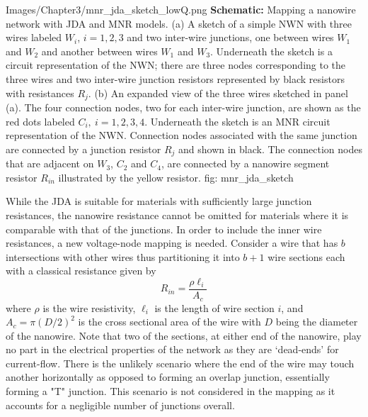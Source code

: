 {Images/Chapter3/mnr_jda_sketch_lowQ.png}
{\textbf{Schematic:} Mapping a nanowire network with JDA and MNR models.}
{ (a) A sketch of a simple NWN with three wires labeled $W_i$, $i = 1,2,3$ and two inter-wire junctions, one between wires $W_1$ and $W_2$ and another between wires $W_1$ and $W_3$\cite{rocha2015}. Underneath the sketch is a circuit representation of the NWN; there are three nodes corresponding to the three wires and two inter-wire junction resistors represented by black resistors with resistances $R_j$. (b) An expanded view of the three wires sketched in panel (a). The four connection nodes, two for each inter-wire junction, are shown as the red dots labeled $C_i, ~ i=1,2,3,4$. Underneath the sketch is an MNR circuit representation of the NWN. Connection nodes associated with the same junction are connected by a junction resistor $R_j$ and shown in black. The connection nodes that are adjacent on $W_3$, $C_2$ and $C_4$, are connected by a nanowire segment resistor $R_{in}$ illustrated by the yellow resistor.}
{fig: mnr_jda_sketch}

While the JDA is suitable for materials with sufficiently large junction resistances, the nanowire resistance cannot be omitted for materials where it is comparable with that of the junctions. In order to include the inner wire resistances, a new voltage-node mapping is needed. Consider a wire that has $b$ intersections with other wires thus partitioning it into $b+1$ wire sections each with a classical resistance given by 
\begin{equation}
R_{in} = \frac{\rho \ell_\textit{i}}{A_c}
\end{equation}
where $\rho$ is the wire resistivity, $\ell_\textit{i}$ is the length of wire section $\textit{i}$, and $A_c = \pi (D/2)^2$ is the cross sectional area of the wire with $D$ being the diameter of the nanowire. Note that two of the sections, at either end of the nanowire, play no part in the electrical properties of the network as they are `dead-ends' for current-flow\cite{ocallaco2016}. There is the unlikely scenario where the end of the wire may touch another horizontally as opposed to forming an overlap junction, essentially forming a "T" junction. This scenario is not considered in the mapping as it accounts for a negligible number of junctions overall.

